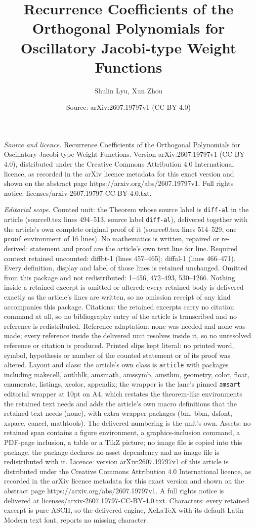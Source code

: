 \documentclass[10pt,a4paper]{amsart}
\title[Recurrence Coefficients of the Orthogonal Polynomials for Os]{Recurrence Coefficients of the Orthogonal Polynomials for Oscillatory Jacobi-type Weight Functions}
\author{Shulin Lyu, Xun Zhou}
\date{Source: arXiv:2607.19797v1 (CC BY 4.0)}
\begin{document}
\maketitle

\noindent\emph{Source and licence.} Recurrence Coefficients of the Orthogonal Polynomials for Oscillatory Jacobi-type Weight Functions. Version arXiv:2607.19797v1 (CC BY 4.0), distributed under the Creative Commons Attribution 4.0 International licence, as recorded in the arXiv licence metadata for this exact version and shown on the abstract page https://arxiv.org/abs/2607.19797v1. Full rights notice: licenses/arxiv-2607.19797-CC-BY-4.0.txt.\par\smallskip

\noindent\textit{Editorial scope.} Counted unit: the Theorem whose source label is \texttt{diff-al} in the article (source0.tex lines 494--513, source label \texttt{diff-al}), delivered together with the article's own complete original proof of it (source0.tex lines 514--529, one \texttt{proof} environment of 16 lines). No mathematics is written, repaired or re-derived: statement and proof are the article's own text line for line. Required context retained uncounted: diffbt-1 (lines 457--465); diffal-1 (lines 466--471). Every definition, display and label of those lines is retained unchanged. Omitted from this package and not redistributed: 1--456, 472--493, 530--1266. Nothing inside a retained excerpt is omitted or altered: every retained body is delivered exactly as the article's lines are written, so no omission receipt of any kind accompanies this package. Citations: the retained excerpts carry no citation command at all, so no bibliography entry of the article is transcribed and no reference is redistributed. Reference adaptation: none was needed and none was made; every reference inside the delivered unit resolves inside it, so no unresolved reference or citation is produced. Printed slips kept literal: no printed word, symbol, hypothesis or number of the counted statement or of its proof was altered. Layout and class: the article's own class is \texttt{article} with packages including makecell, authblk, amsmath, amssymb, amsthm, geometry, color, float, enumerate, listings, xcolor, appendix; the wrapper is the lane's pinned \texttt{amsart} editorial wrapper at 10pt on A4, which restates the theorem-like environments the retained text needs and adds the article's own macro definitions that the retained text needs (none), with extra wrapper packages (bm, bbm, dsfont, xspace, cancel, mathtools). The delivered numbering is the unit's own. Assets: no retained span contains a figure environment, a graphics-inclusion command, a PDF-page inclusion, a table or a TikZ picture; no image file is copied into this package, the package declares no asset dependency and no image file is redistributed with it. Licence: version arXiv:2607.19797v1 of this article is distributed under the Creative Commons Attribution 4.0 International licence, as recorded in the arXiv licence metadata for this exact version and shown on the abstract page https://arxiv.org/abs/2607.19797v1. A full rights notice is delivered at licenses/arxiv-2607.19797-CC-BY-4.0.txt. Characters: every retained excerpt is pure ASCII, so the delivered engine, XeLaTeX with its default Latin Modern text font, reports no missing character.
\end{document}
